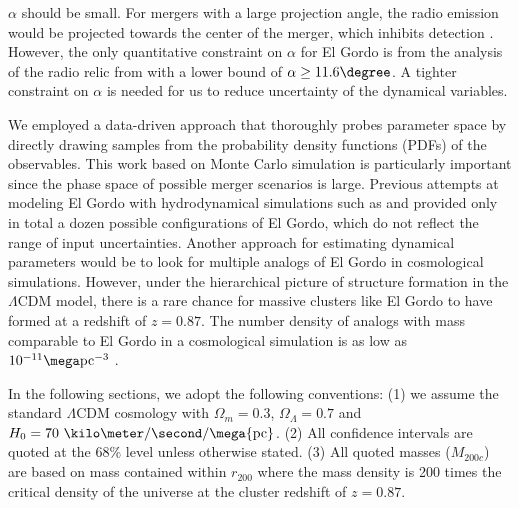 \documentclass[letterpaper,useAMS,usenatbib]{mn2e}
\begin{document}
$\alpha$ should be small. 
For mergers with a
large projection angle, the radio emission would be projected towards the
center of the merger, which inhibits detection \citep{Vazza11}.
However, the only quantitative constraint on $\alpha$ for El Gordo is from
the analysis of the radio relic from \cite{L13} with a lower bound of $\alpha \geq 11.6 \degree$. A tighter
constraint on $\alpha$ is needed for us to reduce uncertainty of the
dynamical variables. 
\par 
We employed a data-driven approach that thoroughly probes parameter
space by directly drawing samples from the probability density functions
(PDFs) of
the observables. 
This work based on Monte Carlo simulation is particularly important since
the phase space of possible merger scenarios is large. Previous attempts at modeling El Gordo with hydrodynamical
simulations such as \cite{Donnert13} and \cite{Molnar14} provided only in
total a dozen possible configurations of El Gordo, which do not
reflect the range of input uncertainties. Another approach for
estimating dynamical parameters would be to look for multiple analogs of El Gordo in cosmological
simulations.  However, under the hierarchical picture
of structure formation in the $\Lambda$CDM model, there is a rare chance
for massive clusters like El Gordo to have formed at a redshift of $z = 0.87$.  
The number density of analogs with mass comparable to El Gordo in a
cosmological simulation is as low as $10^{-11} \mega\text{pc}^{-3}$
.\par
In the following sections, we adopt the following conventions: (1) we
assume the standard $\Lambda$CDM cosmology with $\Omega_{m} = 0.3$,
$\Omega_{\Lambda} = 0.7$ and $H_0 = 70~\kilo\meter / \second / \mega
{\rm pc}$. (2) All confidence intervals are quoted at the 68\% level unless otherwise stated. 
(3) All quoted masses ($M_{200c}$) are based on mass contained
within $r_{200}$ where the mass density is 200 times the critical density
of the universe at the cluster redshift of $z = 0.87$. 
\end{document}
